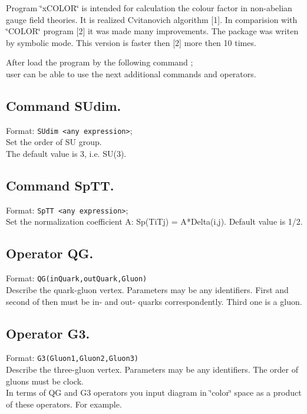 
Program \char`\"{}xCOLOR\char`\"{} is intended for calculation the colour
factor in non-abelian gauge field theories. It is 
realized Cvitanovich algorithm {[}1{]}. In comparision with
\char`\"{}COLOR\char`\"{} program {[}2{]} it was made many improvements.
The package was writen by symbolic mode. This version is
faster then {[}2{]} more then 10 times.


After load the program by the following command ; \\
user can be able to use the next additional commands and operators. 

\subsection*{Command SUdim.}

Format: {\tt SUdim <any expression>}; \\
%
Set the order of SU group. \\
%
The default value is 3, i.e. SU(3). 

\subsection*{Command SpTT.}

Format: {\tt SpTT <any expression>}; \\
%
Set the normalization coefficient A: Sp(TiTj) = A{*}Delta(i,j).
Default value is 1/2. 

\subsection*{Operator QG.}

Format: {\tt QG(inQuark,outQuark,Gluon)} \\
%
Describe the quark-gluon vertex. Parameters may be any identifiers.
First and second of then must be in- and out- quarks correspondently.
Third one is a gluon. 

\subsection*{Operator G3.}

Format: {\tt G3(Gluon1,Gluon2,Gluon3)} \\
%
Describe the three-gluon vertex. Parameters may be any identifiers.
The order of gluons must be clock. \\
%
In terms of QG and G3 operators you input diagram in \char`\"{}color\char`\"{}
space as a product of these operators. For example. 

